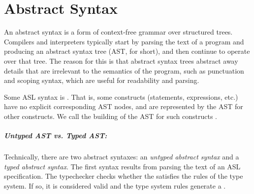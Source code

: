 \chapter{Abstract Syntax\label{chap:AbstractSyntax}}

An abstract syntax is a form of context-free grammar over structured trees.
Compilers and interpreters typically start by parsing the text of a program and producing an abstract syntax tree (AST, for short),
and then continue to operate over that tree.
%
The reason for this is that abstract syntax trees abstract away details that are irrelevant to the semantics of the program,
such as punctuation and scoping syntax, which are useful for readability and parsing.

\begin{definition}
\hypertarget{def-syntacticsugar}{}
Some ASL syntax is \emph{\syntacticsugar}. That is, some constructs (statements, expressions, etc.)
have no explicit corresponding AST nodes, and are represented by the AST for other constructs.
We call the building of the AST for such constructs \emph{\desugaring}.
\end{definition}

\hypertarget{def-typedast}{}
\hypertarget{def-untypedast}{}
\paragraph{Untyped AST vs. Typed AST:}
Technically, there are two abstract syntaxes:
an \emph{untyped abstract syntax} and a \emph{typed abstract syntax}.
The first syntax results from parsing the text of an ASL specification.
The typechecker checks whether the \untypedast{} satisfies the rules of the
type system. If so, it is considered valid and the type system rules
generate a \typedast.

\ChapterOutline



